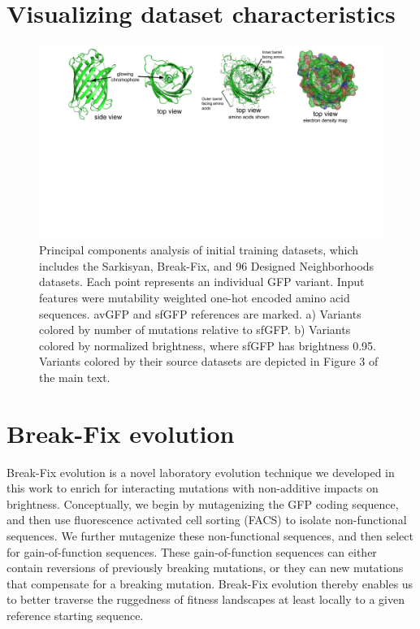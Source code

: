 \section{Visualizing dataset characteristics}
\begin{figure}[h]
  \includegraphics[width=1\linewidth,page=10,trim={0cm 4.5cm 0cm 0}]{figures/2018-05-09-NIPS_2018_Figures.pdf}
  \caption[Principal components analysis of initial training datasets]{Principal components analysis of initial training datasets, which includes the Sarkisyan, Break-Fix, and 96 Designed Neighborhoods datasets. Each point represents an individual GFP variant. Input features were mutability weighted one-hot encoded amino acid sequences. avGFP and sfGFP references are marked. a) Variants colored by number of mutations relative to sfGFP. b) Variants colored by normalized brightness, where sfGFP has brightness 0.95. Variants colored by their source datasets are depicted in Figure 3 of the main text.} \label{pca}
\end{figure}


\section{Break-Fix evolution} \label{sec:breakfix}

Break-Fix evolution is a novel laboratory evolution technique we developed in this work to enrich for interacting mutations with non-additive impacts on brightness. Conceptually, we begin by mutagenizing the GFP coding sequence, and then use fluorescence activated cell sorting (FACS) to isolate non-functional sequences. We further mutagenize these non-functional sequences, and then select for gain-of-function sequences. These gain-of-function sequences can either contain reversions of previously breaking mutations, or they can new mutations that compensate for a breaking mutation. Break-Fix evolution thereby enables us to better traverse the ruggedness of fitness landscapes at least locally to a given reference starting sequence.

